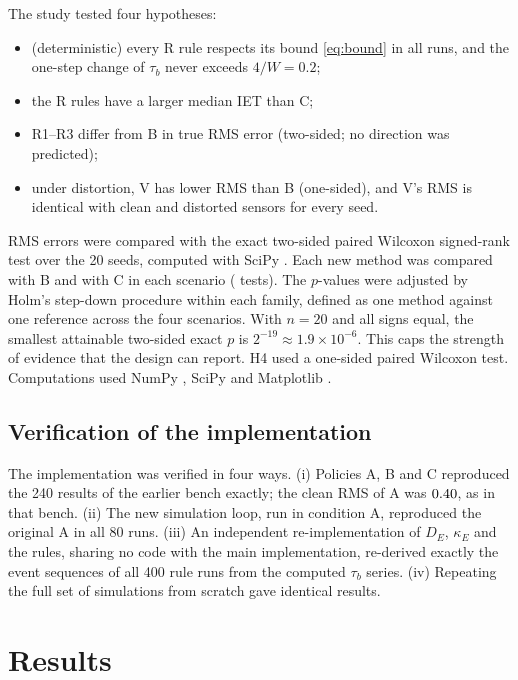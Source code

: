 \documentclass[10pt,a4paper]{article}
\newcommand{\R}[1]{\textup{R#1}}
\begin{document}
The study tested four hypotheses:
\begin{itemize}[leftmargin=2.6em,itemsep=1pt]
\item[\textbf{H1}] (deterministic) every \R{} rule respects its bound \eqref{eq:bound} in all runs, and the one-step change of $\tau_b$ never exceeds $4/W=0.2$;
\item[\textbf{H2}] the \R{} rules have a larger median IET than C;
\item[\textbf{H3}] \R{1}--\R{3} differ from B in true RMS error (two-sided; no direction was predicted);
\item[\textbf{H4}] under distortion, V has lower RMS than B (one-sided), and V's RMS is identical with clean and distorted sensors for every seed.
\end{itemize}
RMS errors were compared with the exact two-sided paired Wilcoxon signed-rank test \citep{wilcoxon1945} over the 20 seeds, computed with SciPy \citep{virtanen2020scipy}. Each new method was compared with B and with C in each scenario (\nTests{} tests). The $p$-values were adjusted by Holm's step-down procedure within each family, defined as one method against one reference across the four scenarios. With $n=20$ and all signs equal, the smallest attainable two-sided exact $p$ is $2^{-19}\approx1.9\times10^{-6}$. This caps the strength of evidence that the design can report. H4 used a one-sided paired Wilcoxon test. Computations used NumPy \citep{harris2020numpy}, SciPy and Matplotlib \citep{hunter2007matplotlib}.

\subsection{Verification of the implementation}\label{sec:qc}
The implementation was verified in four ways. (i) Policies A, B and C reproduced the 240 results of the earlier bench \citep{pv2026miet} exactly; the clean RMS of A was $0.40$, as in that bench. (ii) The new simulation loop, run in condition A, reproduced the original A in all 80 runs. (iii) An independent re-implementation of $D_E$, $\kappa_E$ and the rules, sharing no code with the main implementation, re-derived exactly the event sequences of all 400 rule runs from the computed $\tau_b$ series. (iv) Repeating the full set of simulations from scratch gave identical results.

\section{Results}\label{sec:results}
\end{document}
